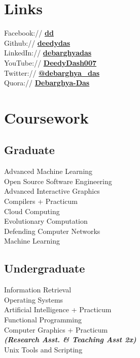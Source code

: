 \documentclass[]{cv}
\begin{document}
\begin{minipage}[t]{0.33\textwidth}
    \section{Links} 
    Facebook:// \href{https://facebook/dd}{\bf dd} \\
    Github:// \href{https://github.com/deedydas}{\bf deedydas} \\
    LinkedIn://  \href{https://www.linkedin.com/in/debarghyadas}{\bf debarghyadas} \\
    YouTube://  \href{https://www.youtube.com/user/DeedyDash007}{\bf DeedyDash007} \\
    Twitter://  \href{https://twitter.com/debarghya_das}{\bf @debarghya\_das} \\
    Quora://  \href{https://www.quora.com/Debarghya-Das}{\bf Debarghya-Das}
    
    
    \section{Coursework}
    \subsection{Graduate}
    Advanced Machine Learning \\
    Open Source Software Engineering \\
    Advanced Interactive Graphics \\
    Compilers + Practicum \\
    Cloud Computing \\
    Evolutionary Computation \\
    Defending Computer Networks \\
    Machine Learning \\
    \sectionsep
    
    \subsection{Undergraduate}
    Information Retrieval \\
    Operating Systems \\
    Artificial Intelligence + Practicum \\
    Functional Programming \\
    Computer Graphics + Practicum \\
    {\footnotesize \textit{\textbf{(Research Asst. \& Teaching Asst 2x) }}} \\
    Unix Tools and Scripting \\
    

\end{minipage}
\end{document}

